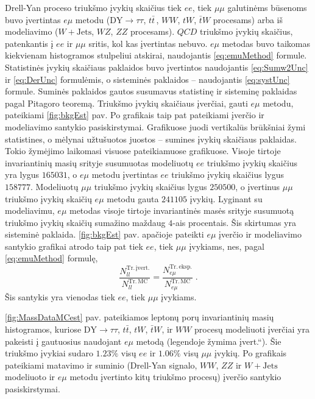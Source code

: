 \documentclass[a4paper, 12pt, twoside]{article}
\newcommand{\tbarW}{\bar{t}W}
\newcommand{\ttbar}{t\bar{t}}
\newcommand{\emu}{e\mu}
\newcommand{\mumu}{\mu\mu}
\newcommand{\DYtau}{\mathrm{DY} \! \rightarrow \! \tau\tau}
\newcommand{\ltq}[1]{{\quotedblbase{}#1\textquotedblleft{}}}
\newlength\q
\begin{document}
Drell-Yan proceso triukšmo įvykių skaičius tiek $ee$, tiek $\mumu$ galutinėms būsenoms buvo įvertintas $\emu$
metodu ($\DYtau$, $t\bar{t}\,$, $WW$, $tW$, $\bar{t}W$ procesams) arba iš modeliavimo ($W+\mathrm{Jets}$, $WZ$,
$ZZ$ procesams).
$QCD$ triukšmo įvykių skaičius, patenkantis į $ee$ ir $\mu\mu$ sritis, kol kas įvertintas nebuvo.
$\emu$ metodas buvo taikomas kiekvienam histogramos stulpeliui atskirai, naudojantis \eqref{eq:emuMethod} formule.
Statistinės įvykių skaičiaus paklaidos buvo įvertintos naudojantis \eqref{eq:Sumw2Unc} ir \eqref{eq:DerUnc}
formulėmis, o sisteminės paklaidos -- naudojantis \eqref{eq:systUnc} formule.
Suminės paklaidos gautos susumavus statistinę ir sisteminę paklaidas pagal Pitagoro teoremą.
Triukšmo įvykių skaičiaus įverčiai, gauti $\emu$ metodu, pateikiami \ref{fig:bkgEst} pav.
Po grafikais taip pat pateikiami įverčio ir modeliavimo santykio pasiskirstymai.
Grafikuose juodi vertikalūs brūkšniai žymi statistines, o mėlynai užtušuotos juostos -- sumines įvykių skaičiaus paklaidas.
Tokio žymėjimo laikomasi visuose pateikiamuose grafikuose.
Visoje tirtoje invariantinių masių srityje susumuotas modeliuotų $ee$ triukšmo įvykių skaičius yra lygus $165031$,
o $e\mu$ metodu įvertintas $ee$ triukšmo įvykių skaičius lygus $158777$.
Modeliuotų $\mu\mu$ triukšmo įvykių skaičius lygus $250500$, o įvertinus $\mu\mu$ triukšmo įvykių skaičių  $e\mu$ metodu
gauta $241105$ įvykių.
Lyginant su modeliavimu, $\emu$ metodas visoje tirtoje invariantinės masės srityje susumuotą triukšmo įvykių skaičių
sumažino maždaug $4$-ais procentais.
Šis skirtumas yra sisteminė paklaida.
\ref{fig:bkgEst} pav. apačioje pateikti $\emu$ įverčio ir modeliavimo santykio grafikai atrodo taip pat
tiek $ee$, tiek $\mu\mu$ įvykiams, nes, pagal \eqref{eq:emuMethod} formulę,
$$\frac{N_{ll}^{\mathrm{Tr. \, įvert.}}}{N_{ll}^{\mathrm{Tr. \, MC}}} =
\frac{N_{\emu}^{\mathrm{Tr. \, eksp.}}}{N_{\emu}^{\mathrm{Tr. \, MC}}} \; .$$
Šis santykis yra vienodas tiek $ee$, tiek $\mu\mu$ įvykiams.

\ref{fig:MassDataMCest} pav. pateikiamos leptonų porų invariantinių masių histogramos, kuriose $\DYtau$, $\ttbar$,
$tW$, $\tbarW$, ir $WW$ procesų modeliuoti įverčiai yra pakeisti į gautuosius naudojant $\emu$ metodą (legendoje žymima
\ltq{įvert.}).
Šie triukšmo įvykiai sudaro $1.23\%$ visų $ee$ ir $1.06\%$ visų $\mu\mu$ įvykių.
Po grafikais pateikiami matavimo ir suminio (Drell-Yan signalo, $WW$, $ZZ$ ir $W+\mathrm{Jets}$ modeliuoto ir 
$e\mu$ metodu įvertinto kitų triukšmo procesų) įverčio santykio pasiskirstymai.
\end{document}
